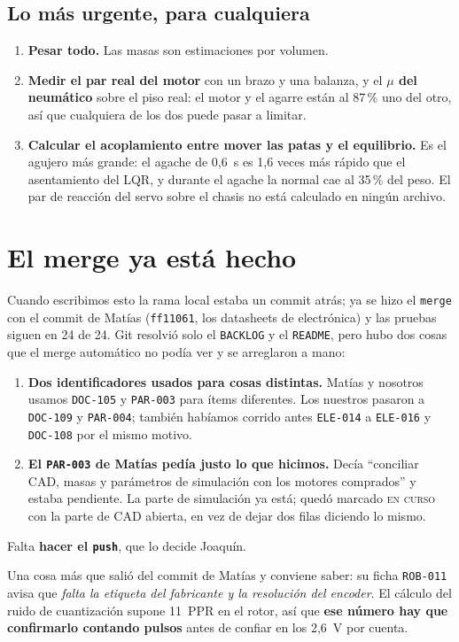 \documentclass[11pt,a4paper]{article}
\begin{document}
\subsection*{Lo más urgente, para cualquiera}

\begin{enumerate}[nosep]
\item \textbf{Pesar todo.} Las masas son estimaciones por volumen.
\item \textbf{Medir el par real del motor} con un brazo y una balanza, y el \textbf{$\mu$ del
  neumático} sobre el piso real: el motor y el agarre están al 87\,\% uno del otro, así que
  cualquiera de los dos puede pasar a limitar.
\item \textbf{Calcular el acoplamiento entre mover las patas y el equilibrio.} Es el agujero más
  grande: el agache de 0,6~s es 1,6 veces más rápido que el asentamiento del LQR, y durante el agache
  la normal cae al 35\,\% del peso. El par de reacción del servo sobre el chasis no está calculado en
  ningún archivo.
\end{enumerate}

\section{El merge ya est\'a hecho}

Cuando escribimos esto la rama local estaba un commit atr\'as; ya se hizo el \texttt{merge} con el
commit de Mat\'ias (\texttt{ff11061}, los datasheets de electr\'onica) y las pruebas siguen en 24 de 24.
Git resolvi\'o solo el \texttt{BACKLOG} y el \texttt{README}, pero hubo dos cosas que el merge
autom\'atico no pod\'ia ver y se arreglaron a mano:

\begin{enumerate}[nosep]
\item \textbf{Dos identificadores usados para cosas distintas.} Mat\'ias y nosotros usamos
  \texttt{DOC-105} y \texttt{PAR-003} para \'items diferentes. Los nuestros pasaron a
  \texttt{DOC-109} y \texttt{PAR-004}; tambi\'en hab\'iamos corrido antes \texttt{ELE-014} a
  \texttt{ELE-016} y \texttt{DOC-108} por el mismo motivo.
\item \textbf{El \texttt{PAR-003} de Mat\'ias ped\'ia justo lo que hicimos.} Dec\'ia
  ``conciliar CAD, masas y par\'ametros de simulaci\'on con los motores comprados'' y estaba
  pendiente. La parte de simulaci\'on ya est\'a; qued\'o marcado \textsc{en curso} con la parte de
  CAD abierta, en vez de dejar dos filas diciendo lo mismo.
\end{enumerate}

Falta \textbf{hacer el \texttt{push}}, que lo decide Joaqu\'in.

Una cosa m\'as que sali\'o del commit de Mat\'ias y conviene saber: su ficha \texttt{ROB-011}
avisa que \emph{falta la etiqueta del fabricante y la resoluci\'on del encoder}. El c\'alculo del
ruido de cuantizaci\'on supone 11~PPR en el rotor, as\'i que \textbf{ese n\'umero hay que
confirmarlo contando pulsos} antes de confiar en los 2,6~V por cuenta.
\end{document}
